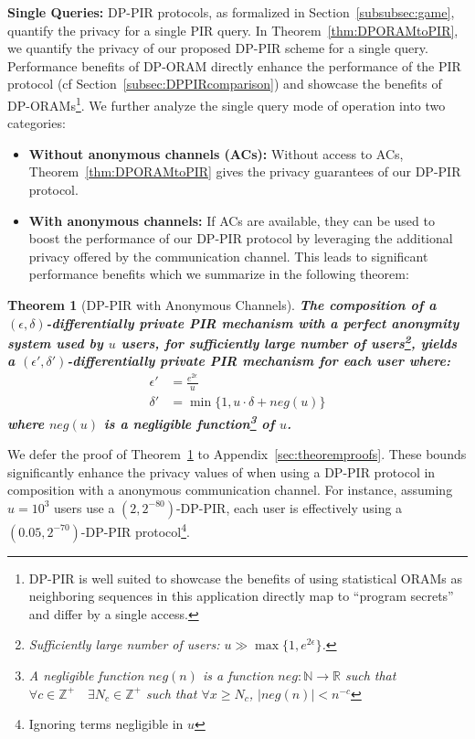 \documentclass[USenglish,oneside,twocolumn]{article}
\newtheorem{theorem}{Theorem}
\begin{document}
\textbf{Single Queries: }DP-PIR protocols, as formalized in Section~\ref{subsubsec:game}, quantify the privacy for a single PIR query. In Theorem~\ref{thm:DPORAMtoPIR}, we quantify the privacy of our proposed DP-PIR scheme for a single query.
Performance benefits of DP-ORAM directly enhance the performance of the PIR protocol (cf Section~\ref{subsec:DPPIRcomparison}) and showcase the benefits of DP-ORAMs\footnote{DP-PIR is well suited to showcase the benefits of using statistical ORAMs as neighboring sequences in this application directly map to ``program secrets'' and differ by a single access.}.
We further analyze the single query mode of operation into two categories:
\begin{itemize}[noitemsep, topsep=1pt]
\itemsep0em 
\item \textbf{Without anonymous channels (ACs): }Without access to ACs, Theorem~\ref{thm:DPORAMtoPIR} gives the privacy guarantees of our DP-PIR protocol.
\item \textbf{With anonymous channels: }If ACs are available, they can be used to boost the performance of our DP-PIR protocol by leveraging the additional privacy offered by the communication channel. This leads to significant performance benefits which we summarize in the following theorem:
\end{itemize}
\begin{theorem}[DP-PIR with Anonymous Channels]\label{thm:DPPIRAnonymousChannels}
\textbf{The composition of a $(\epsilon, \delta)$-differentially private PIR mechanism with a perfect anonymity system used by $u$ users, for sufficiently large number of users\footnote{Sufficiently large number of users: $u \gg \max \{1,e^{2\epsilon} \}$.}, yields a $(\epsilon', \delta')$-differentially private PIR mechanism for each user where:}
\begin{equation}
\begin{aligned}
\epsilon' &= \frac{e^{2\epsilon}}{u} \\
\delta' &= \min \{1, u \cdot \delta + neg(u)\}
\end{aligned}
\end{equation}
\textbf{where $neg(u)$ is a negligible function\footnote{A negligible function $neg(n)$ is a function $neg \colon \mathbb{N} \to \mathbb{R}$ such that $\forall c \in \mathbb{Z}^+ \quad \exists N_c \in \mathbb{Z}^+$ such that $\forall x \geq N_c$,
$|neg(n)| < n^{-c}$} of $u$.}
\end{theorem}
We defer the proof of Theorem~\ref{thm:DPPIRAnonymousChannels} to Appendix~\ref{sec:theoremproofs}. 
These bounds significantly enhance the privacy values of when using a DP-PIR protocol in composition with a anonymous communication channel. For instance, assuming $u = 10^3$ users use a $(2, 2^{-80})$-DP-PIR, each user is effectively using a $(0.05, 2^{-70})$-DP-PIR protocol\footnote{Ignoring terms negligible in $u$}.
\end{document}
